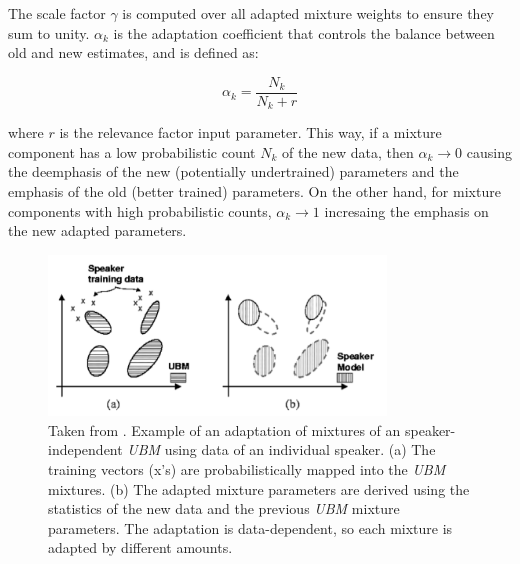 The scale factor $\gamma$ is computed over all adapted mixture weights to ensure they sum to unity.
$\alpha_{k}$ is the adaptation coefficient that controls the balance between old and new
estimates, and is defined as:

\begin{equation}
	\alpha_{k} = \frac{N_{k}}{N_{k} + r}
\end{equation}

where $r$ is the relevance factor input parameter. This way, if a mixture component has a low
probabilistic count $N_{k}$ of the new data, then $\alpha_{k} \to 0$ causing the deemphasis
of the new (potentially undertrained) parameters and the emphasis of the old (better trained)
parameters. On the other hand, for mixture components with high probabilistic counts,
$\alpha_{k} \to 1$ incresaing the emphasis on the new adapted parameters.

\begin{figure}[H]
	\centering
	\includegraphics[width=0.8\textwidth]{files/figures/method/gmm-adaptation}
	\caption{Taken from \cite{ubm_adaptation}. Example
	of an adaptation of mixtures of an speaker-independent \textit{UBM} using data of an
	individual speaker. (a) The training vectors (x's) are probabilistically mapped into
	the \textit{UBM} mixtures. (b) The adapted mixture parameters are derived using the
	statistics of the new data and the previous \textit{UBM} mixture parameters. The
	adaptation is data-dependent, so each mixture is adapted by different amounts.}
\end{figure}

